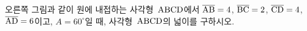 \noindent\begin{minipage}[t]{0.58\linewidth}\vspace{0pt}\raggedright 오른쪽 그림과 같이 원에 내접하는 사각형~$\mathrm{ABCD}$에서 $\overline{\mathrm{AB}}=4$, $\overline{\mathrm{BC}}=2$, $\overline{\mathrm{CD}}=4$, $\overline{\mathrm{AD}}=6$이고, $A=60^\circ$일 때, 사각형~$\mathrm{ABCD}$의 넓이를 구하시오.\end{minipage}\hfill\begin{minipage}[t]{0.4\linewidth}\vspace{0pt}\centering \resizebox{\ifdim\width>\linewidth\linewidth\else\width\fi}{!}{}\end{minipage}\par
